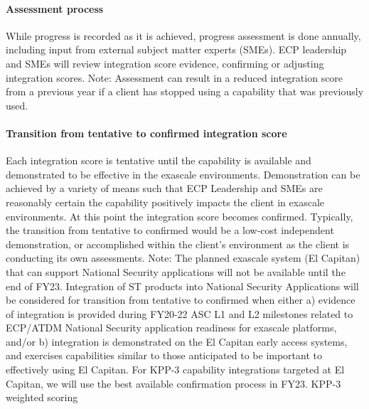 \paragraph{Assessment process}
While progress is recorded as it is achieved, progress assessment is done annually, including input from external subject matter experts (SMEs).  ECP leadership and SMEs will review integration score evidence, confirming or adjusting integration scores.
Note: Assessment can result in a reduced integration score from a previous year if a client has stopped using a capability that was previously used.

\paragraph{Transition from tentative to confirmed integration score}
Each integration score is tentative until the capability is available and demonstrated to be effective in the exascale environments.  Demonstration can be achieved by a variety of means such that ECP Leadership and SMEs are reasonably certain the capability positively impacts the client in exascale environments.  At this point the integration score becomes confirmed. 
Typically, the transition from tentative to confirmed would be a low-cost independent demonstration, or accomplished within the client’s environment as the client is conducting its own assessments. 
Note: The planned exascale system (El Capitan) that can support National Security applications will not be available until the end of FY23. Integration of ST products into National Security Applications will be considered for transition from tentative to confirmed when either a) evidence of integration is provided during FY20-22 ASC L1 and L2 milestones related to ECP/ATDM National Security application readiness for exascale platforms, and/or b) integration is demonstrated on the El Capitan early access systems, and exercises capabilities similar to those anticipated to be important to effectively using El Capitan.  For KPP-3 capability integrations targeted at El Capitan, we will use the best available confirmation process in FY23.
KPP-3 weighted scoring

